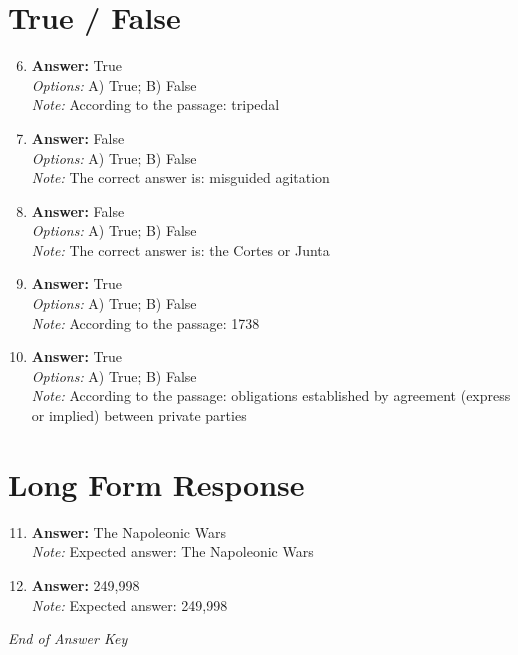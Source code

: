 \documentclass[12pt]{article}
\begin{document}
\section*{True / False}
\begin{enumerate}[label=\arabic*.]
\setcounter{enumi}{5}
\item \textbf{Answer:} True
\\ \textit{Options:} A) True; B) False
\\ \textit{Note:} According to the passage: tripedal
\item \textbf{Answer:} False
\\ \textit{Options:} A) True; B) False
\\ \textit{Note:} The correct answer is: misguided agitation
\item \textbf{Answer:} False
\\ \textit{Options:} A) True; B) False
\\ \textit{Note:} The correct answer is: the Cortes or Junta
\item \textbf{Answer:} True
\\ \textit{Options:} A) True; B) False
\\ \textit{Note:} According to the passage: 1738
\item \textbf{Answer:} True
\\ \textit{Options:} A) True; B) False
\\ \textit{Note:} According to the passage: obligations established by agreement (express or implied) between private parties
\end{enumerate}

\section*{Long Form Response}
\begin{enumerate}[label=\arabic*.]
\setcounter{enumi}{10}
\item \textbf{Answer:} The Napoleonic Wars
\\ \textit{Note:} Expected answer: The Napoleonic Wars
\item \textbf{Answer:} 249,998
\\ \textit{Note:} Expected answer: 249,998
\end{enumerate}

\vfill
\noindent\textit{End of Answer Key}
\end{document}

